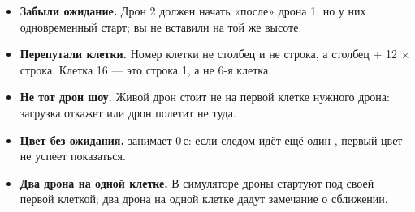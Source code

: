 \begin{itemize}
  \item \textbf{Забыли ожидание.} Дрон 2 должен начать «после» дрона 1, но у них одновременный старт; вы не вставили  на той же высоте.
  \item \textbf{Перепутали клетки.} Номер клетки не столбец и не строка, а столбец + 12 $\times$ строка. Клетка 16 — это строка 1, а не 6-я клетка.
  \item \textbf{Не тот дрон шоу.} Живой дрон стоит не на первой клетке нужного дрона: загрузка откажет или дрон полетит не туда.
  \item \textbf{Цвет без ожидания.}  занимает 0\,с: если следом идёт ещё один , первый цвет не успеет показаться.
  \item \textbf{Два дрона на одной клетке.} В симуляторе дроны стартуют под своей первой клеткой; два дрона на одной клетке дадут замечание о сближении.
\end{itemize}
